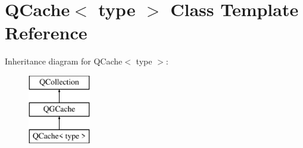 \hypertarget{class_q_cache}{}\section{Q\+Cache$<$ type $>$ Class Template Reference}
\label{class_q_cache}
Inheritance diagram for Q\+Cache$<$ type $>$\+:\begin{figure}[H]
\begin{center}
\leavevmode
\includegraphics[height=3.000000cm]{class_q_cache}
\end{center}
\end{figure}
